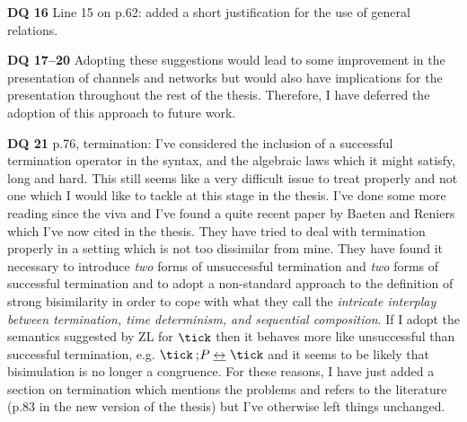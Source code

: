 \documentclass{article}
\begin{document}
\begin{trivlist}
\item[\bf DQ 16]Line 15 on p.62: added a short justification for the use of
general relations.
\item[\bf DQ 17--20] Adopting these suggestions would lead to some
improvement in the presentation of channels and networks but would
also have implications for the presentation throughout the rest of the
thesis. Therefore, I have deferred the adoption of this approach to
future work.
\item[\bf DQ 21] p.76, termination: I've considered the inclusion of a
successful termination operator in the syntax, and the algebraic laws
which it might satisfy, long and hard. This still seems like a very
difficult issue to treat properly and not one which I would like to
tackle at this stage in the thesis. I've done some more reading since
the viva and I've found a quite recent paper by Baeten and Reniers which
I've now cited in the thesis. They have tried to deal with termination
properly in a setting which is not too dissimilar from mine. They have
found it necessary to introduce \emph{two} forms of unsuccessful termination
and \emph{two} forms of successful termination and to adopt a non-standard
approach to the definition of strong bisimilarity in order to cope with
what they call the \emph{intricate interplay between termination, time
determinism, and sequential composition}. If I adopt the semantics
suggested by ZL for $\tick$ then it behaves more like unsuccessful than
successful termination, e.g. $\tick \sq P \bisim \tick$ and it seems to be
likely that bisimulation is no longer a congruence. For these reasons, I
have just added a section on termination which mentions the problems and 
refers to the literature (p.83 in the new version of the thesis) but I've
otherwise left things unchanged.


\end{trivlist}
\end{document}

